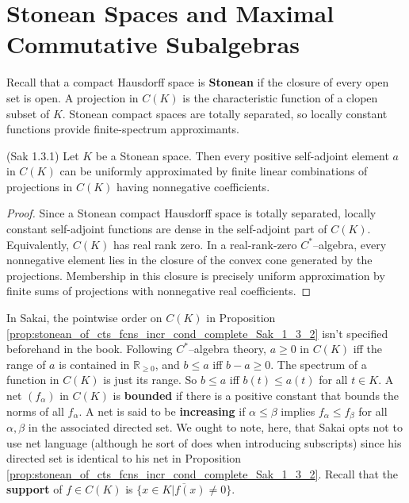 \chapter{Stonean Spaces and Maximal Commutative Subalgebras}

Recall that a compact Hausdorff space is \textbf{Stonean} if the closure of every open set is open.
A projection in $C(K)$ is the characteristic function of a clopen subset of $K$. Stonean compact
spaces are totally separated, so locally constant functions provide finite-spectrum approximants.

\begin{lemma}
  \label{lem:fin_lin_approx_of_stonean_Sak_1_3_1} (Sak  1.3.1)
  \leanok
  Let $K$ be a Stonean space. Then every positive self-adjoint element $a$ in $C(K)$ can be uniformly approximated by 
  finite linear combinations of projections in $C(K)$ having nonnegative coefficients. 
\end{lemma}

\begin{proof}
  \leanok
  Since a Stonean compact Hausdorff space is totally separated, locally constant self-adjoint
  functions are dense in the self-adjoint part of $C(K)$. Equivalently, $C(K)$ has real rank zero.
  In a real-rank-zero $C^{*}$--algebra, every nonnegative element lies in the closure of the
  convex cone generated by the projections. Membership in this closure is precisely uniform
  approximation by finite sums of projections with nonnegative real coefficients.
\end{proof}

In Sakai, the pointwise order on $C(K)$ in Proposition \ref{prop:stonean_of_cts_fcns_incr_cond_complete_Sak_1_3_2}
isn't specified beforehand in the book. Following $C^{*}$--algebra theory, $a\ge 0$ in $C(K)$
iff the range of $a$ is contained in $\mathbb{R}_{\ge 0}$, and $b\le a$ iff $b-a \ge 0$. The spectrum 
of a function in $C(K)$ is just its range. So $b\le a$ iff $b(t)\le a(t)$ for all $t\in K$. A net
 $(f_{\alpha})$ in $C(K)$ is \textbf{bounded} if there is a positive constant that bounds the norms of all $f_{\alpha}$.
A net is said to be \textbf{increasing} if $\alpha \le \beta$ implies $f_{\alpha}\le f_{\beta}$ for all $\alpha,\beta$
in the associated directed set. We ought to note, here, that Sakai opts not to use net language
(although he sort of does when introducing subscripts) since his directed set is identical to his net
in Proposition \ref{prop:stonean_of_cts_fcns_incr_cond_complete_Sak_1_3_2}. Recall that 
the \textbf{support} of $f\in C(K)$ is $\overline{\{x\in K | f(x)\ne 0\}}$.

